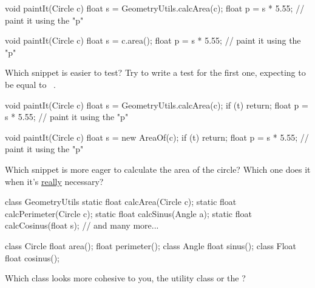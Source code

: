 \documentclass{article}
\begin{document}
\begin{pptWide}{2}
{\small\begin{ffcode}
void paintIt(Circle c) {
  float s = GeometryUtils.calcArea(c);
  float p = s * 5.55;
  // paint it using the "p"
}
\end{ffcode}
}
\par\columnbreak\par
{\small\begin{ffcode}
void paintIt(Circle c) {
  float s = c.area();
  float p = s * 5.55;
  // paint it using the "p"
}
\end{ffcode}
}
\end{pptWide}
\par
Which snippet is easier to test? Try to write a test for the first one,
expecting  to be equal to ~\citep{bugayenko2014blog0505}.
\plush{}

\begin{pptWide}{2}
{\small\begin{ffcode}
void paintIt(Circle c) {
  float s = GeometryUtils.calcArea(c);
  if (t) { return; }
  float p = s * 5.55;
  // paint it using the "p"
}
\end{ffcode}
}
\par\columnbreak\par
{\small\begin{ffcode}
void paintIt(Circle c) {
  float s = new AreaOf(c);
  if (t) { return; }
  float p = s * 5.55;
  // paint it using the "p"
}
\end{ffcode}
}
\end{pptWide}
\par
Which snippet is more eager to calculate the area of the circle?
Which one does it when it's \ul{really} necessary?~\citep{bugayenko2015blog0226}
\plush{}

\begin{pptWide}{2}
{\small\begin{ffcode}
class GeometryUtils {
  static float calcArea(Circle c);
  static float calcPerimeter(Circle c);
  static float calcSinus(Angle a);
  static float calcCosinus(float s);
  // and many more...
}
\end{ffcode}
}
\par\columnbreak\par
{\small\begin{ffcode}
class Circle {
  float area();
  float perimeter();
}
class Angle {
  float sinus();
}
class Float {
  float cosinus();
}
\end{ffcode}
}
\end{pptWide}
\par
Which class looks more cohesive to you, the utility class  or the ?
\plush{}
\end{document}
